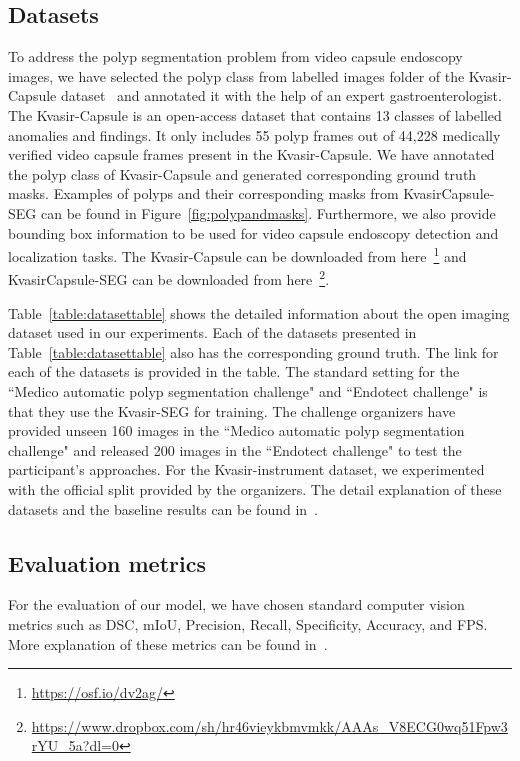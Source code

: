 \documentclass[journal]{IEEEtran}
\begin{document}
\subsection{Datasets}
To address the polyp segmentation problem from video capsule endoscopy images, we have selected the polyp class from labelled images folder of the Kvasir-Capsule dataset~\cite{smedsrud2020kvasir} and annotated it with the help of an expert gastroenterologist. The  Kvasir-Capsule is an open-access dataset that contains 13 classes of labelled anomalies and findings. It only includes 55 polyp frames out of 44,228 medically verified video capsule frames present in the Kvasir-Capsule. We have annotated the polyp class of Kvasir-Capsule and generated corresponding ground truth masks. Examples of polyps and their corresponding masks from KvasirCapsule-SEG can be found in Figure~\ref{fig:polypandmasks}. Furthermore, we also provide bounding box information to be used for video capsule endoscopy detection and localization tasks. The Kvasir-Capsule can be downloaded from here~\footnote{\url{https://osf.io/dv2ag/}} and KvasirCapsule-SEG can be downloaded from here~\footnote{\url{https://www.dropbox.com/sh/hr46vieykbmvmkk/AAAs_V8ECG0wq51Fpw3rYU_5a?dl=0}}.


 Table~\ref{table:datasettable} shows the detailed information about the open imaging dataset used in our experiments. Each of the datasets presented in Table~\ref{table:datasettable} also has the corresponding ground truth. The link for each of the datasets is provided in the table. The standard setting for the ``Medico automatic polyp segmentation challenge" and ``Endotect challenge" is that they use the Kvasir-SEG for training. The challenge organizers have provided unseen 160 images in the ``Medico automatic polyp segmentation challenge" and released 200 images in the ``Endotect challenge" to test the participant's approaches. For the Kvasir-instrument dataset, we experimented with the official split provided by the organizers. The detail explanation of these datasets and the baseline results can be found in~\cite{jha2020kvasir,jha2020kvasirInstrument,jha2020medico,hicksendotect}.
 

\subsection{Evaluation metrics}
For the evaluation of our model, we have chosen standard computer vision metrics such as \ac{DSC}, \ac{mIoU}, Precision, Recall, Specificity, Accuracy, and \ac{FPS}. More explanation of these metrics can be found in~\cite{jha2020kvasir,jha2020kvasirInstrument,jha2020medico,hicksendotect}.  
\end{document}
